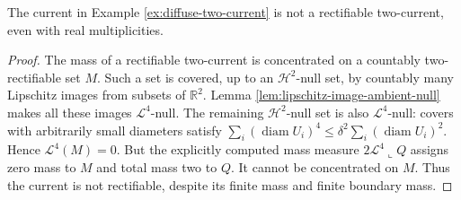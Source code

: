 \begin{proposition}\label{prop:diffuse-current-not-rectifiable}
The current in Example \ref{ex:diffuse-two-current} is not a rectifiable two-current, even with real multiplicities.
\end{proposition}
\begin{proof}
The mass of a rectifiable two-current is concentrated on a countably two-rectifiable set $M$. Such a set is covered, up to an $\mathcal H^2$-null set, by countably many Lipschitz images from subsets of $\mathbb R^2$. Lemma \ref{lem:lipschitz-image-ambient-null} makes all these images $\mathcal L^4$-null. The remaining $\mathcal H^2$-null set is also $\mathcal L^4$-null: covers with arbitrarily small diameters satisfy $\sum_i(\operatorname{diam}U_i)^4\leq\delta^2\sum_i(\operatorname{diam}U_i)^2$. Hence $\mathcal L^4(M)=0$. But the explicitly computed mass measure $2\mathcal L^4\llcorner Q$ assigns zero mass to $M$ and total mass two to $Q$. It cannot be concentrated on $M$. Thus the current is not rectifiable, despite its finite mass and finite boundary mass.
\end{proof}

